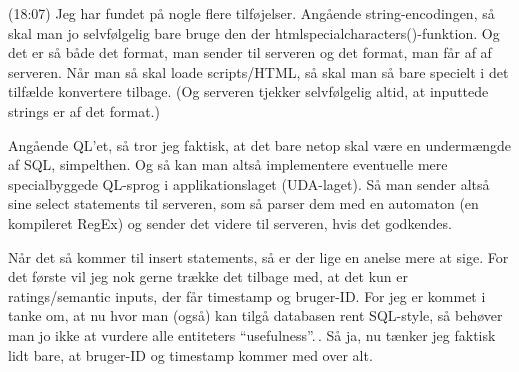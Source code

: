 \documentclass{report}
\begin{document}
(18:07) Jeg har fundet på nogle flere tilføjelser. Angående string-encodingen, så skal man jo selvfølgelig bare bruge den der htmlspecialcharacters()-funktion. Og det er så både det format, man sender til serveren og det format, man får af af serveren. Når man så skal loade scripts/HTML, så skal man så bare specielt i det tilfælde konvertere tilbage. (Og serveren tjekker selvfølgelig altid, at inputtede strings er af det format.)

Angående QL'et, så tror jeg faktisk, at det bare netop skal være en undermængde af SQL, simpelthen. Og så kan man altså implementere eventuelle mere specialbyggede QL-sprog i applikationslaget (UDA-laget). Så man sender altså sine select statements til serveren, som så parser dem med en automaton (en kompileret RegEx) og sender det videre til serveren, hvis det godkendes.

Når det så kommer til insert statements, så er der lige en anelse mere at sige. For det første vil jeg nok gerne trække det tilbage med, at det kun er ratings/semantic inputs, der får timestamp og bruger-ID. For jeg er kommet i tanke om, at nu hvor man (også) kan tilgå databasen rent SQL-style, så behøver man jo ikke at vurdere alle entiteters ``usefulness''.\,. Så ja, nu tænker jeg faktisk lidt bare, at bruger-ID og timestamp kommer med over alt. 
\end{document}
